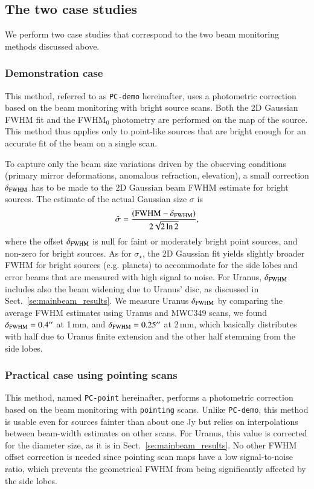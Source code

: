 \documentclass[traditionalabstract]{aa}
\newcommand{\nico}[1]{#1}
\begin{document}
{\begin{appendix}
\subsection{The two case studies}

We perform two case studies that correspond to the two beam monitoring
methods discussed above.\\

\subsubsection{Demonstration case} This method, referred to as {\tt PC-demo} hereinafter, uses a
photometric correction based on the beam monitoring with bright source
scans. Both the 2D Gaussian FWHM fit and the FWHM$_0$ photometry are performed
on the map of the source. This method thus applies only to point-like sources
that are bright enough for an accurate fit of the beam on a single scan.

To capture only the beam size variations driven by the
observing conditions (primary mirror deformations, anomalous
refraction, elevation), a small correction $\delta_{\rm{FWHM}}$ has to be made to
the 2D Gaussian beam FWHM estimate for bright sources. The estimate of the
actual Gaussian size $\sigma$ is
\begin{equation}
  \hat{\sigma} = \frac{(\rm{FWHM} - \delta_{\rm{FWHM}})}{2\sqrt{2 \ln{2}}}, 
\end{equation} 
where the offset $\delta_{\rm{FWHM}}$ is null for faint or moderately
bright point sources, and non-zero for bright sources.
As for $\sigma_\star$, the 2D Gaussian fit yields slightly broader
FWHM for bright sources (e.g. planets) to accommodate
for the side lobes and error beams that are measured with high signal to noise.
For Uranus, $\delta_{\rm{FWHM}}$ includes also the beam widening due
to Uranus' disc, as discussed in Sect.~\ref{se:mainbeam_results}.
We measure Uranus $\delta_{\rm{FWHM}}$
by comparing the average %
FWHM estimates using Uranus
and MWC349 scans, we found $\delta_{\rm{FWHM}} = 0.4''$ at
1\,mm, and $\delta_{\rm{FWHM}} = 0.25''$ at 2\,mm, which basically
distributes with half due to Uranus finite extension and the
other half stemming from the side lobes.\\

\subsubsection{Practical case using pointing scans} This method,
named {\tt PC-point} hereinafter, performs a photometric correction based on the beam monitoring with
{\tt pointing} scans. 
Unlike {\tt PC-demo}, this method is usable even for sources fainter than
about one Jy \nico{but relies on interpolations between beam-width estimates on
  other scans}. For Uranus, this value is corrected for the diameter size, as it is in
Sect.~\ref{se:mainbeam_results}. No other FWHM offset correction is needed since
pointing scan maps have a low signal-to-noise ratio, which prevents the
geometrical FWHM from being significantly affected by the side lobes.



\end{appendix}}
\end{document}
